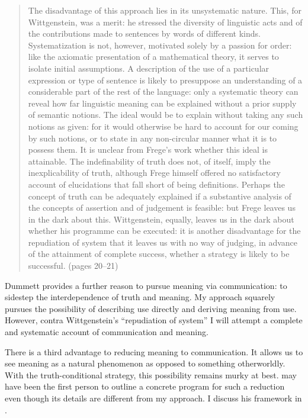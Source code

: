 \begin{quote}
The disadvantage of this approach lies in its unsystematic nature. This, for Wittgenstein, was a merit: he stressed the diversity of linguistic acts and of the contributions made to sentences by words of different kinds. Systematization is not, however, motivated solely by a passion for order: like the axiomatic presentation of a mathematical theory, it serves to isolate initial assumptions. A description of the use of a particular expression or type of sentence is likely to presuppose an understanding of a considerable part of the rest of the language: only a systematic theory can reveal how far linguistic meaning can be explained without a prior supply of semantic notions. The ideal would be to explain without taking any such notions as given: for it would otherwise be hard to account for our coming by such notions, or to state in any non-circular manner what it is to possess them. It is unclear from Frege's work whether this ideal is attainable. The indefinability of truth does not, of itself, imply the inexplicability of truth, although Frege himself offered no satisfactory account of elucidations that fall short of being definitions. Perhaps the concept of truth can be adequately explained if a substantive analysis of the concepts of assertion and of judgement is feasible: but Frege leaves us in the dark about this. Wittgenstein, equally, leaves us in the dark about whether his programme can be executed: it is another disadvantage for the repudiation of system that it leaves us with no way of judging, in advance of the attainment of complete success, whether a strategy is likely to be successful. (pages 20--21)
\end{quote}


Dummett provides a further reason to pursue meaning via communication: to sidestep the interdependence of truth and meaning. My approach squarely pursues the possibility of describing use directly and deriving meaning from use. However, contra Wittgenstein's ``repudiation of system'' I will attempt a complete and systematic account of communication and meaning. 


There is a third advantage to reducing meaning to communication. It allows us to see meaning as a natural phenomenon as opposed to something otherworldly. With the truth-conditional strategy, this possibility remains murky at best. \citet{grice:sitwow} may have been the first person to outline a concrete program for such a reduction even though its details are different from my approach. I discuss his framework in .

